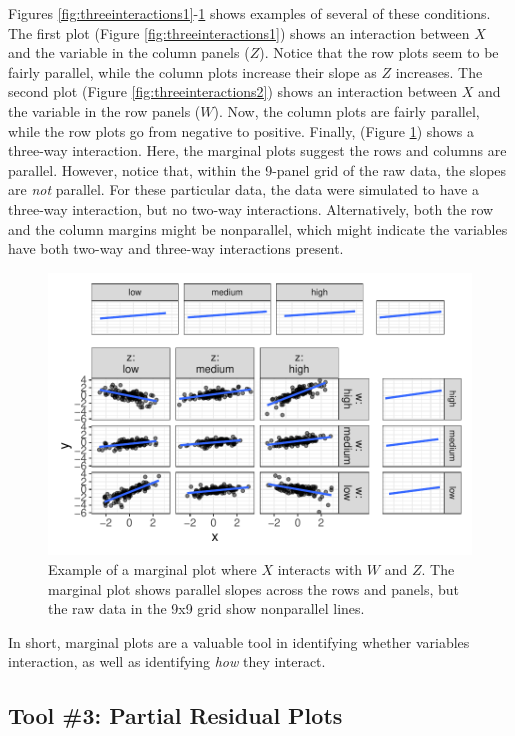 \documentclass[
  man,floatsintext]{apa6}
\begin{document}
Figures \ref{fig:threeinteractions1}-\ref{fig:threeinteractions3} shows examples of several of these conditions. The first plot (Figure \ref{fig:threeinteractions1}) shows an interaction between \(X\) and the variable in the column panels (\(Z\)). Notice that the row plots seem to be fairly parallel, while the column plots increase their slope as \(Z\) increases. The second plot (Figure \ref{fig:threeinteractions2}) shows an interaction between \(X\) and the variable in the row panels (\(W\)). Now, the column plots are fairly parallel, while the row plots go from negative to positive. Finally, (Figure \ref{fig:threeinteractions3}) shows a three-way interaction. Here, the marginal plots suggest the rows and columns are parallel. However, notice that, within the 9-panel grid of the raw data, the slopes are \emph{not} parallel. For these particular data, the data were simulated to have a three-way interaction, but no two-way interactions. Alternatively, both the row and the column margins might be nonparallel, which might indicate the variables have both two-way and three-way interactions present.

\begin{figure}

{\centering \includegraphics[width=0.75\linewidth]{visual_partitions_files/figure-latex/threeinteractions3-1} 

}

\caption{Example of a marginal plot where $X$ interacts with $W$ and $Z$. The marginal plot shows parallel slopes across the rows and panels, but the raw data in the 9x9 grid show nonparallel lines.}\label{fig:threeinteractions3}
\end{figure}

In short, marginal plots are a valuable tool in identifying whether variables interaction, as well as identifying \emph{how} they interact.

\subsection{Tool \#3: Partial Residual Plots}\label{tool-3-partial-residual-plots}
\end{document}

